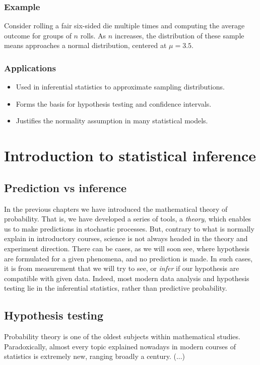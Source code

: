 \documentclass{book}
\begin{document}
\subsection{Example}
Consider rolling a fair six-sided die multiple times and computing the average outcome for groups of $n$ rolls. As $n$ increases, the distribution of these sample means approaches a normal distribution, centered at $\mu=3.5$.

\subsection{Applications}
\begin{itemize}
    \item Used in inferential statistics to approximate sampling distributions.
    \item Forms the basis for hypothesis testing and confidence intervals.
    \item Justifies the normality assumption in many statistical models.
\end{itemize}

\chapter{Introduction to statistical inference}

\section{Prediction vs inference}
In the previous chapters we have introduced the mathematical theory of probability. That is, we have developed a series of tools, a \textit{theory}, which enables us to make predictions in stochastic processes. But, contrary to what is normally explain in introductory courses, science is not always headed in the theory and experiment direction. There can be cases, as we will soon see, where hypothesis are formulated for a given phenomena, and no prediction is made. In such cases, it is from measurement that we will try to see, or \textit{infer} if our hypothesis are compatible with given data. Indeed, most modern data analysis and hypothesis testing lie in the inferential statistics, rather than predictive probability.

\section{Hypothesis testing}
Probability theory is one of the oldest subjects within mathematical studies. Paradoxically, almost every topic explained nowadays in modern courses of statistics is extremely new, ranging broadly a century. (...)\\
\end{document}
